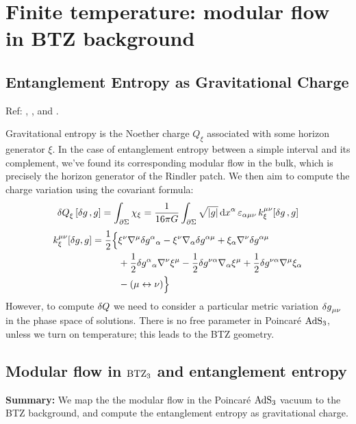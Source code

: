 \documentclass[11pt,a4paper]{article}
\begin{document}
	
\pagebreak
\section{Finite temperature: modular flow in BTZ background}
\subsection{Entanglement Entropy as Gravitational Charge}
	Ref: \textcite{Wald:1993nt,Iyer:1994ys,Iyer:1995kg}, \textcite{Lewkowycz:2013nqa}, and \textcite{Faulkner:2013ana}.
	
	Gravitational entropy is the Noether charge $Q_\xi$ associated with some horizon generator $\xi$. In the case of entanglement entropy between a simple interval and its complement, we've found its corresponding modular flow in the bulk, which is precisely the horizon generator of the Rindler patch. We then aim to compute the charge variation using the covariant formula:
	\begin{equation}
		\var{Q}_{\xi} [\var{g}, g]
		= \int_{\partial\Sigma}
			\chi_\xi
		= \frac{1}{16 \pi G}
			\int_{\partial\Sigma}
			\sqrt{|g|} \dd{x}^{\alpha}
				\varepsilon_{\alpha\mu\nu}\,
				k_\xi^{\mu\nu} [\var{g}, g]
	\end{equation}
	\begin{equation}
	\begin{aligned}
		k_\xi^{\mu\nu}[\var g, g]
		= \frac{1}{2} \Big \{
		& \xi^{\nu}\nabla^{\mu} \var g^{\alpha}{}_{\alpha}
		- \xi^{\nu} \nabla_{\alpha} \var g^{\alpha\mu}
		+ \xi_{\alpha} \nabla^{\nu} \var g^{\alpha\mu}  \\
		&+ \frac{1}{2} \var g^{\alpha}{}_{\alpha} \nabla^{\nu} \xi^{\mu}
		- \frac{1}{2} \var g^{\nu\alpha} \nabla_{\alpha}\xi^{\mu}
		+ \frac{1}{2} \var g^{\nu\alpha} \nabla^{\mu} \xi_{\alpha} \\
		&- (\mu \leftrightarrow \nu) \Big \}
	\end{aligned}
	\label{kdef}
	\end{equation}
	However, to compute $\var{Q}$ we need to consider a particular metric variation $\var{g}_{\mu\nu}$ in the phase space of solutions. There is no free parameter in Poincar\'e $\mathrm{AdS}_3$, unless we turn on temperature; this leads to the BTZ geometry. 
	
\subsection{Modular flow in $\mathrm{BTZ}_3$ and entanglement entropy}
\textbf{Summary:} We map the the modular flow in the Poincar\'e $\mathrm{AdS}_3$ vacuum to the BTZ background, and compute the entanglement entropy as gravitational charge. 
\end{document}
